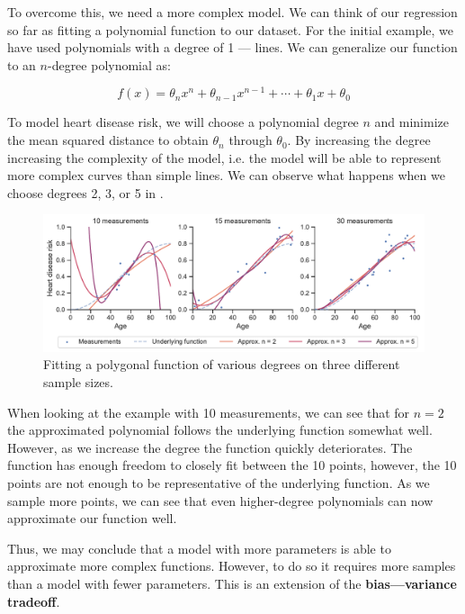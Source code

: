 To overcome this, we need a more complex model. We can think of our regression so far as fitting a polynomial function to our dataset. For the initial example, we have used polynomials with a degree of 1 --- lines. We can generalize our function to an $n$-degree polynomial as:

\begin{equation}
	f(x) = \theta_n x^n + \theta_{n-1}x^{n-1} + \cdots + \theta_1 x + \theta_0
\end{equation}

To model heart disease risk, we will choose a polynomial degree $n$ and minimize the mean squared distance to obtain $\theta_n$ through $\theta_0$. By increasing the degree increasing the complexity of the model, i.e. the model will be able to represent more complex curves than simple lines. We can observe what happens when we choose degrees 2, 3, or 5 in .

\begin{figure}[h!]
 \centering
 \includegraphics[width=\linewidth]{images/3/heart_disease_risk_samples_degrees}
 \caption{Fitting a polygonal function of various degrees on three different sample sizes.}
 \label{fig:reg-deg-2}
\end{figure}

When looking at the example with 10 measurements, we can see that for $n = 2$ the approximated polynomial follows the underlying function somewhat well. However, as we increase the degree the function quickly deteriorates. The function has enough freedom to closely fit between the 10 points, however, the 10 points are not enough to be representative of the underlying function. As we sample more points, we can see that even higher-degree polynomials can now approximate our function well. 

Thus, we may conclude that a model with more parameters is able to approximate more complex functions. However, to do so it requires more samples than a model with fewer parameters. This is an extension of the \textbf{bias---variance tradeoff}. 

